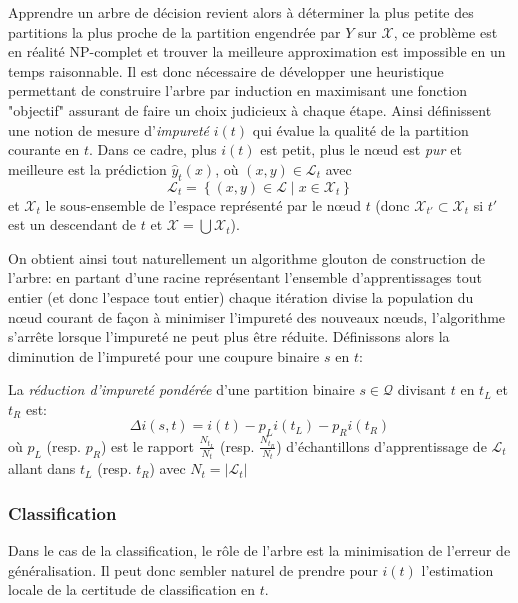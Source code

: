 Apprendre un arbre de décision revient alors à déterminer la plus petite des partitions la plus proche de la partition engendrée par $Y$ sur $\mathcal{X}$, ce problème est en réalité NP-complet et trouver la meilleure approximation est impossible en un temps raisonnable. Il est donc nécessaire de développer une heuristique permettant de construire l'arbre par induction en maximisant une fonction "objectif" assurant de faire un choix judicieux à chaque étape. Ainsi \citet{Breiman1984a} définissent une notion de mesure d'\emph{impureté} $i(t)$ qui évalue la qualité de la partition courante en $t$. Dans ce cadre, plus $i(t)$ est petit, plus le nœud est \emph{pur} et meilleure est la prédiction $\hat{y}_t (x)$, où $(x,y) \in \mathcal{L}_t$ avec
\begin{equation*}
    \mathcal{L}_t = \left \{ (x,y) \in \mathcal{L} \mid x \in \mathcal{X}_t \right\}    
\end{equation*}
et $\mathcal{X}_t$ le sous-ensemble de l'espace représenté par le nœud $t$ (donc $\mathcal{X}_{t'} \subset \mathcal{X}_t$ si $t'$ est un descendant de $t$ et $\mathcal{X} = \bigcup \mathcal{X}_t$).

On obtient ainsi tout naturellement un algorithme glouton de construction de l'arbre: en partant d'une racine représentant l'ensemble d'apprentissages tout entier (et donc l'espace tout entier) chaque itération divise la population du nœud courant de façon à minimiser l'impureté des nouveaux nœuds, l'algorithme s'arrête lorsque l'impureté ne peut plus être réduite.
Définissons alors la diminution de l'impureté pour une coupure binaire $s$ en $t$:

\begin{definition}
    La \emph{réduction d'impureté pondérée} d'une partition binaire $s \in \mathcal{Q}$ divisant $t$ en $t_L$ et $t_R$ est:
    \begin{equation*}
        \Delta i(s,t) = i(t) - p_L i(t_L) - p_R i(t_R)
    \end{equation*}
    où $p_L$ (resp. $p_R$) est le rapport $\frac{N_{t_L}}{N_t}$ (resp. $\frac{N_{t_R}}{N_t}$) d'échantillons d'apprentissage de $\mathcal{L}_t$ allant dans $t_L$ (resp. $t_R$) avec $N_t = \vert \mathcal{L}_t \vert$
\end{definition}

\subsubsection{Classification}

Dans le cas de la classification, le rôle de l'arbre est la minimisation de l'erreur de généralisation. Il peut donc sembler naturel de prendre pour $i(t)$ l'estimation locale de la certitude de classification en $t$.


